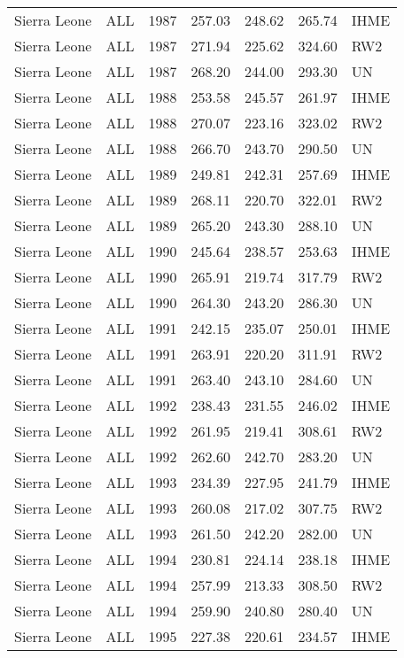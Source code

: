 \begin{longtable}{lllrrrl}
  Sierra Leone & ALL & 1987 & 257.03 & 248.62 & 265.74 & IHME \\ 
  Sierra Leone & ALL & 1987 & 271.94 & 225.62 & 324.60 & RW2 \\ 
  Sierra Leone & ALL & 1987 & 268.20 & 244.00 & 293.30 & UN \\ 
  Sierra Leone & ALL & 1988 & 253.58 & 245.57 & 261.97 & IHME \\ 
  Sierra Leone & ALL & 1988 & 270.07 & 223.16 & 323.02 & RW2 \\ 
  Sierra Leone & ALL & 1988 & 266.70 & 243.70 & 290.50 & UN \\ 
  Sierra Leone & ALL & 1989 & 249.81 & 242.31 & 257.69 & IHME \\ 
  Sierra Leone & ALL & 1989 & 268.11 & 220.70 & 322.01 & RW2 \\ 
  Sierra Leone & ALL & 1989 & 265.20 & 243.30 & 288.10 & UN \\ 
  Sierra Leone & ALL & 1990 & 245.64 & 238.57 & 253.63 & IHME \\ 
  Sierra Leone & ALL & 1990 & 265.91 & 219.74 & 317.79 & RW2 \\ 
  Sierra Leone & ALL & 1990 & 264.30 & 243.20 & 286.30 & UN \\ 
  Sierra Leone & ALL & 1991 & 242.15 & 235.07 & 250.01 & IHME \\ 
  Sierra Leone & ALL & 1991 & 263.91 & 220.20 & 311.91 & RW2 \\ 
  Sierra Leone & ALL & 1991 & 263.40 & 243.10 & 284.60 & UN \\ 
  Sierra Leone & ALL & 1992 & 238.43 & 231.55 & 246.02 & IHME \\ 
  Sierra Leone & ALL & 1992 & 261.95 & 219.41 & 308.61 & RW2 \\ 
  Sierra Leone & ALL & 1992 & 262.60 & 242.70 & 283.20 & UN \\ 
  Sierra Leone & ALL & 1993 & 234.39 & 227.95 & 241.79 & IHME \\ 
  Sierra Leone & ALL & 1993 & 260.08 & 217.02 & 307.75 & RW2 \\ 
  Sierra Leone & ALL & 1993 & 261.50 & 242.20 & 282.00 & UN \\ 
  Sierra Leone & ALL & 1994 & 230.81 & 224.14 & 238.18 & IHME \\ 
  Sierra Leone & ALL & 1994 & 257.99 & 213.33 & 308.50 & RW2 \\ 
  Sierra Leone & ALL & 1994 & 259.90 & 240.80 & 280.40 & UN \\ 
  Sierra Leone & ALL & 1995 & 227.38 & 220.61 & 234.57 & IHME \\ 

\end{longtable}
